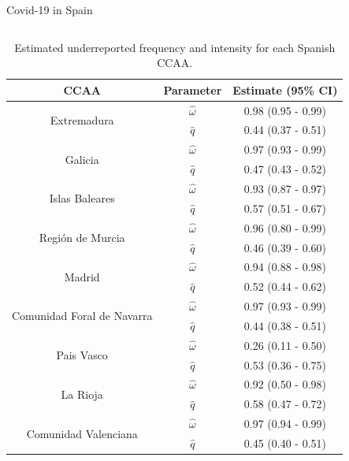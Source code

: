 \documentclass[
    10pt,
    aspectratio=169,
    usenames,
    dvipsnames
]{beamer}
\begin{document}
\begin{frame}{Covid-19 in Spain}
\begin{columns}
    \begin{column}{0.5\textwidth}
    \vspace{-1cm}
          \begin{table}\tiny
    \caption{Estimated underreported frequency and intensity for each Spanish CCAA.}
\begin{tabular}{ccc}
\toprule
CCAA & Parameter & Estimate (95\% CI)\\
\midrule
\multirow{2}{*}{Extremadura}    & $\hat{\omega}$  & 0.98 (0.95 - 0.99) \\
                                & $\hat{q}$       & 0.44 (0.37 - 0.51) \\
\midrule
\multirow{2}{*}{Galicia}     & $\hat{\omega}$  & 0.97 (0.93 - 0.99) \\
                             & $\hat{q}$       & 0.47 (0.43 - 0.52) \\
\midrule
\multirow{2}{*}{Islas Baleares}    & $\hat{\omega}$  & 0.93 (0.87 - 0.97) \\
                                   & $\hat{q}$       & 0.57 (0.51 - 0.67) \\
\midrule
\multirow{2}{*}{Regi\'on de Murcia}    & $\hat{\omega}$  & 0.96 (0.80 - 0.99) \\
                                       & $\hat{q}$       & 0.46 (0.39 - 0.60) \\
\midrule
\multirow{2}{*}{Madrid}      & $\hat{\omega}$  & 0.94 (0.88 - 0.98) \\
                             & $\hat{q}$       & 0.52 (0.44 - 0.62) \\
\midrule
\multirow{2}{*}{Comunidad Foral de Navarra}    & $\hat{\omega}$  & 0.97 (0.93 - 0.99) \\
                                               & $\hat{q}$       & 0.44 (0.38 - 0.51) \\
\midrule
\multirow{2}{*}{Pais Vasco}    & $\hat{\omega}$  & 0.26 (0.11 - 0.50) \\
                               & $\hat{q}$       & 0.53 (0.36 - 0.75) \\
\midrule
\multirow{2}{*}{La Rioja}    & $\hat{\omega}$  & 0.92 (0.50 - 0.98) \\
                             & $\hat{q}$       & 0.58 (0.47 - 0.72) \\
\midrule
\multirow{2}{*}{Comunidad Valenciana}    & $\hat{\omega}$  & 0.97 (0.94 - 0.99) \\
                                         & $\hat{q}$       & 0.45 (0.40 - 0.51) \\
\bottomrule
\end{tabular}
\end{table}
\end{column}
\end{columns}
\end{frame}
\end{document}
